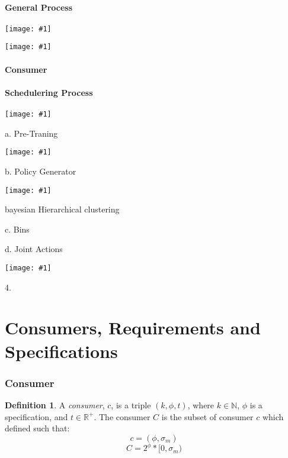 \documentclass{article}
\theoremstyle{definition}
\newtheorem{definition}{Definition}[section]
\theoremstyle{remark}
\newcommand{\addpic}[1]{\texttt{[image: \#1]}}
\begin{document}
	\subsection{General Process}
	
	
			
	
	\addpic{Intro1.jpg}	
	
	\addpic{Intro2.jpg}
	

	\subsection{Consumer}
	
	
	
	\subsection{Schedulering Process}
	
	
	\addpic{Training2.jpg}
	
	
		a. Pre-Traning
	
	
	\addpic{Pre-Train.jpg}
	
	
		b. Policy Generator
	
	
	\addpic{Policy.png}
	
	bayesian Hierarchical clustering
	
	c. Bins
	
	 d. Joint Actions
	
	
	\addpic{Joint-action.jpg}
	
	
	
	
	
	
	4. 
	
	\newpage
	
	\part{Consumers, Requirements and Specifications}
	
	\section{Consumer}
	
		\begin{definition}
			A \emph{consumer}, $c$, is a triple $(k, \phi, t)$, where $k \in \mathbb{N}$, $\phi$ is a specification, and $t \in \mathbb{R}^{+}$. The consumer $C$ is the subset of consumer $c$ which defined such that:
			\[
			c = (\phi , \sigma_m)
			\]
			\[
			C = 2^{\phi}*[0,\sigma_m)
			\]
		\end{definition}
		
\end{document}
